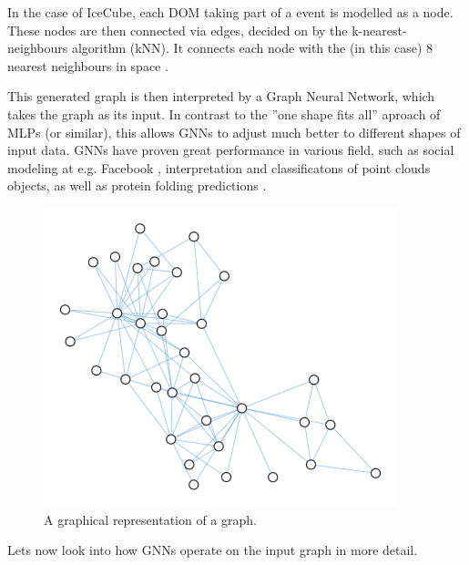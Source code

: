 \documentclass[a4paper,10pt]{scrartcl}
\begin{document}
In the case of IceCube, each DOM taking part of a event is modelled as a node.
These nodes are then connected via edges, decided on by the k-nearest-neighbours algorithm (kNN).
It connects each node with the (in this case) 8 nearest neighbours in space \cite{rasmus-master}.

This generated graph is then interpreted by a Graph Neural Network, which takes the graph as its input.
In contrast to the ''one shape fits all'' aproach of MLPs (or similar), this allows GNNs to adjust much better to different shapes of input data.
GNNs have proven great performance in various field, such as social modeling at e.g. Facebook \cite{facebook}, interpretation and classificatons of point clouds objects, as well as protein folding predictions \cite{STROKACH2020402}.


\begin{figure}[h]
    \includegraphics[scale=0.6]{images/graphneuralnetwork.png}
    \centering
    \caption{A graphical representation of a graph.}
    \label{fig:graphneuralnetwork}
\end{figure}

Lets now look into how GNNs operate on the input graph in more detail.
\end{document}
